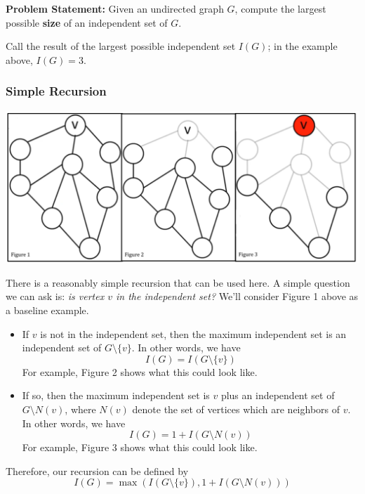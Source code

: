 \documentclass[letterpaper]{article}
\begin{document}
\textbf{Problem Statement:} Given an undirected graph $G$, compute the largest possible \textbf{size} of an independent set of $G$. 

\bigskip 

Call the result of the largest possible independent set $I(G)$; in the example above, $I(G) = 3$. 


\subsubsection{Simple Recursion}
\begin{center}
    \includegraphics[scale=0.35]{assets/ind_set_ex.png}
\end{center}

There is a reasonably simple recursion that can be used here. A simple question we can ask is: \emph{is vertex $v$ in the independent set?} We'll consider Figure 1 above as a baseline example.
\begin{itemize}
    \item If $v$ is not in the independent set, then the maximum independent set is an independent set of $G \setminus \{v\}$. In other words, we have 
    \[I(G) = I(G \setminus \{v\})\]
    For example, Figure 2 shows what this could look like.
    \item If so, then the maximum independent set is $v$ plus an independent set of $G \setminus N(v)$, where $N(v)$ denote the set of vertices which are neighbors of $v$. In other words, we have 
    \[I(G) = 1 + I(G \setminus N(v))\]
    For example, Figure 3 shows what this could look like.
\end{itemize}
Therefore, our recursion can be defined by 
\[I(G) = \max(I(G \setminus \{v\}), 1 + I(G \setminus N(v)))\]
\end{document}
